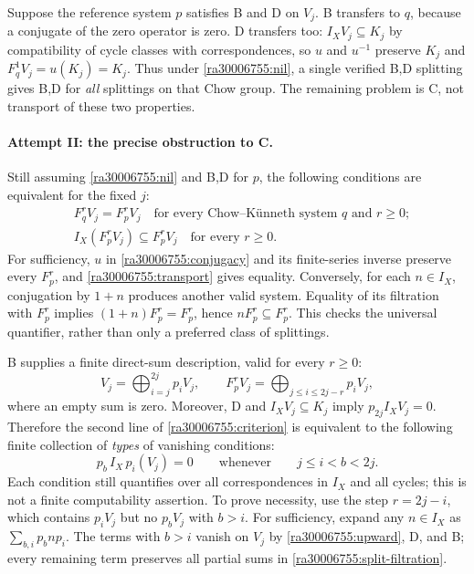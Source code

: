 \documentclass[11pt]{article}
\begin{document}
Suppose the reference system $p$ satisfies B and D on $V_j$.  B transfers to
$q$, because a conjugate of the zero operator is zero.  D transfers too:
$I_X V_j\subseteq K_j$ by compatibility of cycle classes with correspondences,
so $u$ and $u^{-1}$ preserve $K_j$ and
$F_q^1V_j=u(K_j)=K_j$.  Thus under \eqref{ra30006755:nil}, a single verified B,D
splitting gives B,D for \emph{all} splittings on that Chow group.  The
remaining problem is C, not transport of these two properties.

\paragraph{Attempt II: the precise obstruction to C.}
Still assuming \eqref{ra30006755:nil} and B,D for $p$, the following conditions are
equivalent for the fixed $j$:
\begin{equation}\label{ra30006755:criterion}
 \begin{aligned}
 &F_q^r V_j=F_p^r V_j\quad\text{for every Chow--K\"unneth system $q$ and $r\geq0$};\\
 &I_X(F_p^r V_j)\subseteq F_p^r V_j\quad\text{for every $r\geq0$}.
 \end{aligned}
\end{equation}
For sufficiency, $u$ in \eqref{ra30006755:conjugacy} and its finite-series inverse
preserve every $F_p^r$, and \eqref{ra30006755:transport} gives equality.  Conversely,
for each $n\in I_X$, conjugation by $1+n$ produces another valid system.
Equality of its filtration with $F_p^r$ implies
$(1+n)F_p^r=F_p^r$, hence $nF_p^r\subseteq F_p^r$.  This checks the universal
quantifier, rather than only a preferred class of splittings.

B supplies a finite direct-sum description, valid for every $r\geq0$:
\begin{equation}\label{ra30006755:split-filtration}
 V_j=\bigoplus_{i=j}^{2j}p_iV_j,\qquad
 F_p^rV_j=\bigoplus_{j\leq i\leq 2j-r}p_iV_j,
\end{equation}
where an empty sum is zero.  Moreover, D and $I_XV_j\subseteq K_j$ imply
$p_{2j}I_XV_j=0$.  Therefore the second line of
\eqref{ra30006755:criterion} is equivalent to the following finite collection of
\emph{types} of vanishing conditions:
\begin{equation}\label{ra30006755:upward}
 p_b\,I_X\,p_i(V_j)=0
 \qquad\text{whenever}\qquad j\leq i<b<2j.
\end{equation}
Each condition still quantifies over all correspondences in $I_X$ and all
cycles; this is not a finite computability assertion.
To prove necessity, use the step $r=2j-i$, which contains $p_iV_j$ but no
$p_bV_j$ with $b>i$.  For sufficiency, expand any $n\in I_X$ as
$\sum_{b,i}p_b n p_i$.  The terms with $b>i$ vanish on $V_j$ by
\eqref{ra30006755:upward}, D, and B; every remaining term preserves all partial sums
in \eqref{ra30006755:split-filtration}.
\end{document}
